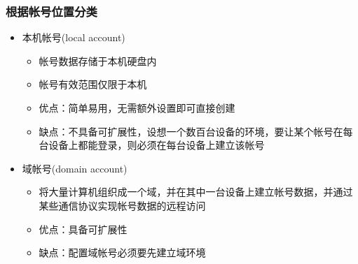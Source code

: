 \documentclass[xcolor=svgnames,presentation]{beamer}
\begin{document}
\begin{frame}
\frametitle{根据帐号位置分类}
\label{sec-1-1-3}
\begin{itemize}

\item 本机帐号(local account)
\label{sec-1-1-3-1}%
\begin{itemize}

\item 帐号数据存储于本机硬盘内
\label{sec-1-1-3-1-1}%

\item 帐号有效范围仅限于本机
\label{sec-1-1-3-1-2}%

\item 优点：简单易用，无需额外设置即可直接创建
\label{sec-1-1-3-1-3}%

\item 缺点：不具备可扩展性，设想一个数百台设备的环境，要让某个帐号在每台设备上都能登录，则必须在每台设备上建立该帐号
\label{sec-1-1-3-1-4}%
\end{itemize} %

\item 域帐号(domain account)
\label{sec-1-1-3-2}%
\begin{itemize}

\item 将大量计算机组织成一个域，并在其中一台设备上建立帐号数据，并通过某些通信协议实现帐号数据的远程访问
\label{sec-1-1-3-2-1}%

\item 优点：具备可扩展性
\label{sec-1-1-3-2-2}%

\item 缺点：配置域帐号必须要先建立域环境
\label{sec-1-1-3-2-3}%
\end{itemize} %
\end{itemize} %
\end{frame}
\end{document}
